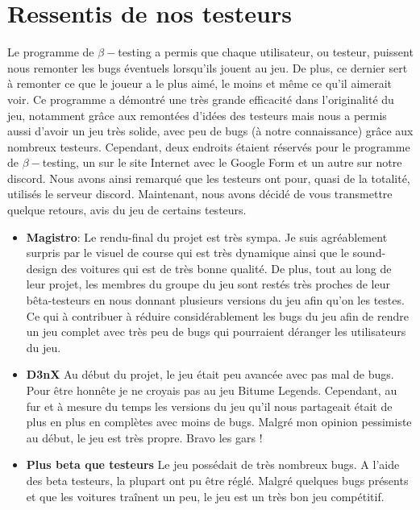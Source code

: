 \documentclass[a4paper,12pt]{article}
\begin{document}
        \clearpage
    \section{Ressentis de nos testeurs}
        Le programme de \(\beta-\)testing a permis que chaque utilisateur, ou testeur, puissent nous remonter les bugs éventuels lorsqu'ils jouent au jeu. De plus, ce dernier sert à remonter ce que le joueur a le plus aimé, le moins et même ce qu'il aimerait voir. Ce programme a démontré une très grande efficacité dans l'originalité du jeu, notamment grâce aux remontées d'idées des testeurs mais nous a permis aussi d'avoir un jeu très solide, avec peu de bugs (à notre connaissance) grâce aux nombreux testeurs. Cependant, deux endroits étaient réservés pour le programme de \(\beta-\)testing, un sur le site Internet avec le Google Form et un autre sur notre discord. Nous avons ainsi remarqué que les testeurs ont pour, quasi de la totalité, utilisés le serveur discord.
        Maintenant, nous avons décidé de vous transmettre quelque retours, avis du jeu de certains testeurs.\\
    
        \begin{itemize}
            \item {\bfseries Magistro}: Le rendu-final du projet est très sympa. Je suis agréablement surpris par le visuel de course qui est très dynamique ainsi que le sound-design des voitures qui est de très bonne qualité. De plus, tout au long de leur projet, les membres du groupe du jeu sont restés très proches de leur bêta-testeurs en nous donnant plusieurs versions du jeu afin qu'on les testes. Ce qui à contribuer à réduire considérablement les bugs du jeu afin de rendre un jeu complet avec très peu de bugs qui pourraient déranger les utilisateurs du jeu.
            \item {\bfseries D3nX} Au début du projet, le jeu était peu avancée avec pas mal de bugs. Pour être honnête je ne croyais pas au jeu Bitume Legends. Cependant, au fur et à mesure du temps les versions du jeu qu'il nous partageait était de plus en plus en complètes avec moins de bugs. Malgré mon opinion pessimiste au début, le jeu est très propre. Bravo les gars !
            \item {\bfseries Plus beta que testeurs} Le jeu possédait de très nombreux bugs. A l'aide des beta testeurs, la plupart ont pu être réglé. Malgré quelques bugs présents et que les voitures traînent un peu, le jeu est un très bon jeu compétitif.   
        \end{itemize}
    
\end{document}
